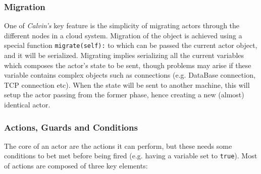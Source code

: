 \subsubsection{Migration}

One of \textit{Calvin's} key feature is the simplicity of migrating actors through the
different nodes in a cloud system. Migration of the object is achieved using a special function
\texttt{migrate(self):} to which can be passed the current actor object, and it will be serialized.
Migrating implies serializing all the current variables which composes the actor's state to be sent, though
problems may arise if these variable contains complex objects such as connections (e.g. DataBase connection,
TCP connection etc). When the state will be sent to another machine, this will setup the actor
passing from the former phase, hence creating a new (almost) identical actor.

\subsubsection{Actions, Guards and Conditions}

The core of an actor are the actions it can perform, but these needs some conditions to bet met
before being fired (e.g. having a variable set to \texttt{true}). Most of actions are composed of three
key elements:

